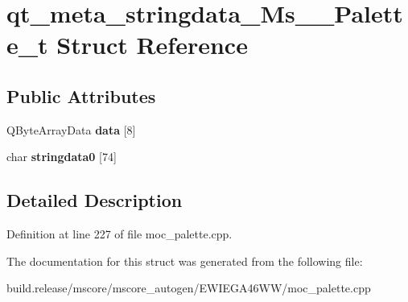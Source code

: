 \hypertarget{structqt__meta__stringdata___ms_____palette__t}{}\section{qt\+\_\+meta\+\_\+stringdata\+\_\+\+Ms\+\_\+\+\_\+\+Palette\+\_\+t Struct Reference}
\label{structqt__meta__stringdata___ms_____palette__t}
\subsection*{Public Attributes}
\begin{DoxyCompactItemize}
\item 
\mbox{\label{structqt__meta__stringdata___ms_____palette__t_a0f4e656ef9e92a614daff85c15f25b42}} 
Q\+Byte\+Array\+Data {\bfseries data} \mbox{[}8\mbox{]}
\item 
\mbox{\label{structqt__meta__stringdata___ms_____palette__t_aa3940985f7fec14f64d9218528923c02}} 
char {\bfseries stringdata0} \mbox{[}74\mbox{]}
\end{DoxyCompactItemize}


\subsection{Detailed Description}


Definition at line 227 of file moc\+\_\+palette.\+cpp.



The documentation for this struct was generated from the following file\+:\begin{DoxyCompactItemize}
\item 
build.\+release/mscore/mscore\+\_\+autogen/\+E\+W\+I\+E\+G\+A46\+W\+W/moc\+\_\+palette.\+cpp\end{DoxyCompactItemize}
